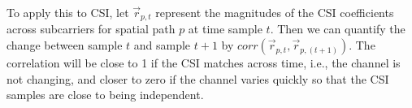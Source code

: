 To apply this to CSI, let $\vec{r}_{p,t}$ represent the magnitudes of the CSI coefficients across subcarriers for spatial path $p$ at time sample $t$. Then we can quantify the change between sample $t$ and sample $t+1$ by $\textit{corr}(\vec{r}_{p,t},\vec{r}_{p,(t+1)})$. The correlation will be close to 1 if the CSI matches across time, i.e., the channel is not changing, and closer to zero if the channel varies quickly so that the CSI samples are close to being independent.

\begin{figure}[htb]
	\centering
	\hspace{0.06\textwidth}%
	

\end{figure}
